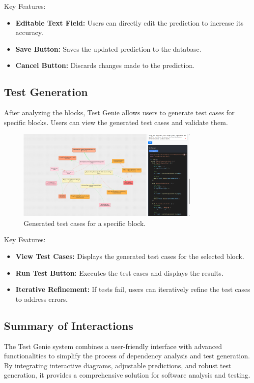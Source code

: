 Key Features:
\begin{itemize}
    \item \textbf{Editable Text Field:} Users can directly edit the prediction to increase its accuracy.
    \item \textbf{Save Button:} Saves the updated prediction to the database.
    \item \textbf{Cancel Button:} Discards changes made to the prediction.
\end{itemize}

\subsection{Test Generation}

After analyzing the blocks, Test Genie allows users to generate test cases for specific blocks. Users can view the generated test cases and validate them.

\begin{figure}[H]
    \centering
    \includegraphics[width=0.8\textwidth]{images/generated_test.png}
    \caption{Generated test cases for a specific block.}
    \label{fig:generated-test}
\end{figure}

Key Features:
\begin{itemize}
    \item \textbf{View Test Cases:} Displays the generated test cases for the selected block.
    \item \textbf{Run Test Button:} Executes the test cases and displays the results.
    \item \textbf{Iterative Refinement:} If tests fail, users can iteratively refine the test cases to address errors.
\end{itemize}

\subsection{Summary of Interactions}

The Test Genie system combines a user-friendly interface with advanced functionalities to simplify the process of dependency analysis and test generation. By integrating interactive diagrams, adjustable predictions, and robust test generation, it provides a comprehensive solution for software analysis and testing.